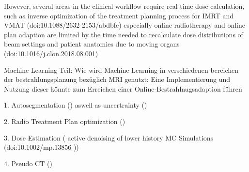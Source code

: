 However, several areas in the clinical workflow require real-time dose calculation, such as inverse optimization of the treatment planning process for IMRT and VMAT (doi:10.1088/2632-2153/abdbfe)
especially online radiotherapy and online plan adaption are limited by the time needed to recalculate dose distributions of beam settings and patient anatomies due to moving organs (doi:10.1016/j.clon.2018.08.001)


Machine Learning Teil: Wie wird Machine Learning in verschiedenen bereichen der bestrahlungsplanung bezüglich MRI genutzt:
Eine Implementierung und Nutzung dieser könnte zum Erreichen einer Online-Bestrahlnugsadaption führen

1. Autosegmentation (\cite{kazemifar_segmentation_2018, liang_deep-learning-based_2019}) aswell as uncertrainty (\cite{shen_medical_2019})

2. Radio Treatment Plan optimization (\cite{fan_automatic_2019, liu_deep_2019})

3. Dose Estimation (\cite{kontaxis_deepdose_2020, bai_deep_2021} active denoising of lower history MC Simulations (doi:10.1002/mp.13856 ))

4. Pseudo CT (\cite{han_mr-based_2017, wolterink_deep_2017, dinkla_mr-only_2018})




